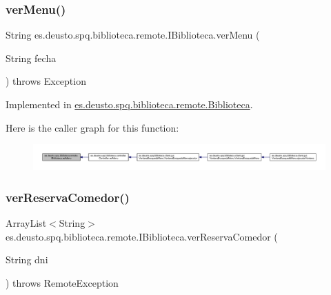 \subsubsection{\texorpdfstring{ver\+Menu()}{verMenu()}}
{\footnotesize\ttfamily String es.\+deusto.\+spq.\+biblioteca.\+remote.\+I\+Biblioteca.\+ver\+Menu (\begin{DoxyParamCaption}\item[{String}]{fecha }\end{DoxyParamCaption}) throws Exception}



Implemented in \mbox{\hyperlink{classes_1_1deusto_1_1spq_1_1biblioteca_1_1remote_1_1_biblioteca_ad964168fdca53a12ab747247617f41c7}{es.\+deusto.\+spq.\+biblioteca.\+remote.\+Biblioteca}}.

Here is the caller graph for this function\+:
\nopagebreak
\begin{figure}[H]
\begin{center}
\leavevmode
\includegraphics[width=350pt]{interfacees_1_1deusto_1_1spq_1_1biblioteca_1_1remote_1_1_i_biblioteca_a7a9df6fad07fe2cfe50c261b5e048365_icgraph}
\end{center}
\end{figure}
\mbox{\label{interfacees_1_1deusto_1_1spq_1_1biblioteca_1_1remote_1_1_i_biblioteca_a95f0223ecd802f703977d838c72a93bf}} 
\subsubsection{\texorpdfstring{ver\+Reserva\+Comedor()}{verReservaComedor()}}
{\footnotesize\ttfamily Array\+List$<$String$>$ es.\+deusto.\+spq.\+biblioteca.\+remote.\+I\+Biblioteca.\+ver\+Reserva\+Comedor (\begin{DoxyParamCaption}\item[{String}]{dni }\end{DoxyParamCaption}) throws Remote\+Exception}



